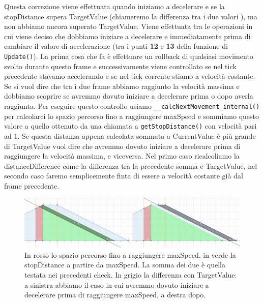 \documentclass[main.tex]{subfiles}
\begin{document}
\noindent Questa correzione viene effettuata quando iniziamo a decelerare e se la stopDistance supera TargetValue (chiameremo la differenza tra i due valori ), ma non abbiamo ancora superato TargetValue. Viene effettuata tra le operazioni in cui viene deciso che dobbiamo iniziare a decelerare e immediatamente prima di cambiare il valore di accelerazione (tra i punti \textbf{12} e \textbf{13} della funzione di \lstinline{Update()}). La prima cosa che fa è effettuare un rollback di qualsiasi movimento svolto durante questo frame e successivamente viene controllato se nel tick precedente stavamo accelerando e se nel tick corrente stiamo a velocità costante. Se si vuol dire che tra i due frame abbiamo raggiunto la velocità massima e dobbiamo scoprire se avremmo dovuto iniziare a decelerare prima o dopo averla raggiunta. Per eseguire questo controllo usiamo \lstinline{__calcNextMovement_internal()} per calcolarci lo spazio percorso fino a raggiungere maxSpeed e sommiamo questo valore a quello ottenuto da una chiamata a \lstinline{getStopDistance()} con velocità pari ad 1. Se questa distanza appena calcolata sommata a CurrentValue è più grande di TargetValue vuol dire che avremmo dovuto iniziare a decelerare prima di raggiungere la velocità massima, e viceversa. Nel primo caso ricalcoliamo la distanceDifference come la differenza tra la precedente somma e TargetValue, nel secondo caso faremo semplicemente finta di essere a velocità costante già dal frame precedente.
\begin{figure}[H]
    \centering
    \includegraphics[width=1\linewidth]{img/interpolazione/compensateLateCall3Case.png}
    \caption{In rosso lo spazio percorso fino a raggiungere maxSpeed, in verde la stopDistance a partire da maxSpeed. La somma dei due è quella testata nei precedenti check. In grigio la differenza con TargetValue: a sinistra abbiamo il caso in cui avremmo dovuto iniziare a decelerare prima di raggiungere maxSpeed, a destra dopo.}
    \label{fig:4_compensateLateCall3Case}
\end{figure}
\end{document}
